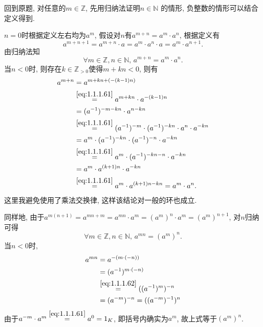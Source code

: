\begin{solution}
\begin{enumerate}[(1)]
    回到原题, 对任意的$m \in \mathbb{Z}$, 先用归纳法证明$n \in \mathbb{N}$
    的情形, 负整数的情形可以结合定义得到.

    $n = 0$时根据定义左右均为$a^m$, 假设对$n$有$a^{m + n} = a^m \cdot a^n$, 根据定义有
    \[
        a^{m + n + 1} = a^{m + n} \cdot a = a^m \cdot a^n \cdot a = a^m \cdot a^{n + 1}.
    \]
    由归纳法知
    \begin{equation}
        \forall m \in \mathbb{Z}, n \in \mathbb{N} ,\, a^{m + n} = a^m \cdot a^n.
        \tag{*}
        \label{eq:1.1.1.61}
    \end{equation} 
    当$n < 0$时, 则存在$k \in \mathbb{Z}_{>0}$使得$m + kn < 0$,
    则有
    \[
    \begin{aligned}
        a^{m + n} &= a^{m + kn + (-(k - 1)n)}\\
        &\overset{\eqref{eq:1.1.1.61}}= a^{m + kn} \cdot a^{-(k - 1)n}\\
        &= (a^{-1})^{-m - kn} \cdot a^{n - kn}\\
        &\overset{\eqref{eq:1.1.1.61}}= (a^{-1})^{-m} \cdot (a^{-1})^{-kn} \cdot a^n \cdot a^{-kn}\\
        &= a^m \cdot (a^{-1})^{-kn} \cdot (a^{-1})^{-n} \cdot a^{-kn}\\
        &\overset{\eqref{eq:1.1.1.61}}= a^m \cdot (a^{-1})^{-kn - n} \cdot a^{-kn}\\
        &= a^m \cdot a^{(k + 1)n} \cdot a^{-kn}\\
        &\overset{\eqref{eq:1.1.1.61}}= a^m \cdot a^{(k + 1)n - kn} = a^m \cdot a^n.
    \end{aligned}
    \]
    这里我避免使用了乘法交换律, 这样该结论对一般的环也成立.

    同样地, 由于$a^{m(n + 1)} = a^{mn + m} = a^{mn} \cdot a^m = (a^{m})^n \cdot a^m = (a^m)^{n + 1}$,
    对$n$归纳可得
    \begin{equation}
        \forall m \in \mathbb{Z}, n \in \mathbb{N},\, a^{mn} = (a^m)^n.
        \tag{**}
        \label{eq:1.1.1.62}
    \end{equation}
    当$n < 0$时, 
    \[
    \begin{aligned}
        a^{mn} &= a^{-(m \cdot (-n))}\\
        &= (a^{-1})^{m \cdot (-n)}\\
        &\overset{\eqref{eq:1.1.1.62}}= ((a^{-1})^m)^{-n}\\
        &= (a^{-m})^{-n} = ((a^{-m})^{-1})^n
    \end{aligned}
    \]
    由于$a^{-m} \cdot a^m \overset{\eqref{eq:1.1.1.61}}= a^0 = 1_K$, 即括号内确实为$a^m$,
    故上式等于$(a^m)^n$.
    \end{enumerate}
\end{solution}

